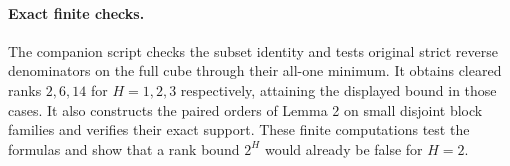 \documentclass[11pt]{article}
\begin{document}
\paragraph{Exact finite checks.}
The companion script checks the subset identity and tests original
strict reverse denominators on the full cube through their all-one
minimum. It obtains cleared ranks $2,6,14$ for $H=1,2,3$ respectively,
attaining the displayed bound in those cases. It also constructs the
paired orders of Lemma 2 on small disjoint block families and verifies
their exact support. These finite computations test the formulas and
show that a rank bound $2^H$ would already be false for $H=2$.
\end{document}
